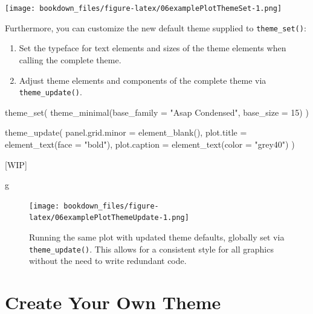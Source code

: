 \documentclass[
]{krantz}
\makeatletter
\newenvironment{Shaded}{\begin{snugshade}}{\end{snugshade}}
\newcommand{\AttributeTok}[1]{\textcolor[rgb]{0.61,0.61,0.61}{#1}}
\newcommand{\DecValTok}[1]{\textcolor[rgb]{0.06,0.06,0.06}{#1}}
\newcommand{\FunctionTok}[1]{\textcolor[rgb]{0,0,0}{#1}}
\newcommand{\NormalTok}[1]{#1}
\newcommand{\StringTok}[1]{\textcolor[rgb]{0.5,0.5,0.5}{#1}}
\providecommand{\tightlist}{%
  \setlength{\itemsep}{0pt}\setlength{\parskip}{0pt}}
\newenvironment{kframe}{%
\medskip{}
\setlength{\fboxsep}{.8em}
 \def\at@end@of@kframe{}%
 \ifinner\ifhmode%
  \def\at@end@of@kframe{\end{minipage}}%
  \begin{minipage}{\columnwidth}%
 \fi\fi%
 \def\FrameCommand##1{\hskip\@totalleftmargin \hskip-\fboxsep
 \colorbox{shadecolor}{##1}\hskip-\fboxsep
     \hskip-\linewidth \hskip-\@totalleftmargin \hskip\columnwidth}%
 \MakeFramed {\advance\hsize-\width
   \@totalleftmargin\z@ \linewidth\hsize
   \@setminipage}}%
 {\par\unskip\endMakeFramed%
 \at@end@of@kframe}
\renewenvironment{Shaded}{\begin{kframe}}{\end{kframe}}
\makeatother
\begin{document}
\texttt{[image: bookdown\_files/figure-latex/06examplePlotThemeSet-1.png]}

Furthermore, you can customize the new default theme supplied to \texttt{theme\_set()}:

\begin{enumerate}
\def\labelenumi{\arabic{enumi}.}
\tightlist
\item
  Set the typeface for text elements and sizes of the theme elements when calling the complete theme.
\item
  Adjust theme elements and components of the complete theme via \texttt{theme\_update()}.
\end{enumerate}

\begin{Shaded}
\begin{Highlighting}[]
\FunctionTok{theme\_set}\NormalTok{(}
  \FunctionTok{theme\_minimal}\NormalTok{(}\AttributeTok{base\_family =} \StringTok{"Asap Condensed"}\NormalTok{, }\AttributeTok{base\_size =} \DecValTok{15}\NormalTok{)}
\NormalTok{)}

\FunctionTok{theme\_update}\NormalTok{(}
  \AttributeTok{panel.grid.minor =} \FunctionTok{element\_blank}\NormalTok{(),}
  \AttributeTok{plot.title =} \FunctionTok{element\_text}\NormalTok{(}\AttributeTok{face =} \StringTok{"bold"}\NormalTok{),}
  \AttributeTok{plot.caption =} \FunctionTok{element\_text}\NormalTok{(}\AttributeTok{color =} \StringTok{"grey40"}\NormalTok{)}
\NormalTok{)}
\end{Highlighting}
\end{Shaded}

{[}WIP{]}

\begin{Shaded}
\begin{Highlighting}[]
\NormalTok{g}
\end{Highlighting}
\end{Shaded}

\begin{figure}
\centering
\texttt{[image: bookdown\_files/figure-latex/06examplePlotThemeUpdate-1.png]}
\caption{\label{fig:06examplePlotThemeUpdate}Running the same plot with updated theme defaults, globally set via \texttt{theme\_update()}. This allows for a consistent style for all graphics without the need to write redundant code.}
\end{figure}

\hypertarget{create-your-own-theme}{%
\section{Create Your Own Theme}\label{create-your-own-theme}}
\end{document}
